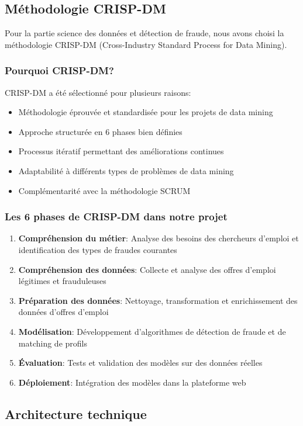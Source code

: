 \documentclass[10pt,a4paper,twocolumn]{article}
\begin{document}
\subsection{Méthodologie CRISP-DM}
Pour la partie science des données et détection de fraude, nous avons choisi la méthodologie CRISP-DM (Cross-Industry Standard Process for Data Mining).

\subsubsection{Pourquoi CRISP-DM?}
CRISP-DM a été sélectionné pour plusieurs raisons:
\begin{itemize}
    \item Méthodologie éprouvée et standardisée pour les projets de data mining
    \item Approche structurée en 6 phases bien définies
    \item Processus itératif permettant des améliorations continues
    \item Adaptabilité à différents types de problèmes de data mining
    \item Complémentarité avec la méthodologie SCRUM
\end{itemize}

\subsubsection{Les 6 phases de CRISP-DM dans notre projet}
\begin{enumerate}
    \item \textbf{Compréhension du métier}: Analyse des besoins des chercheurs d'emploi et identification des types de fraudes courantes
    \item \textbf{Compréhension des données}: Collecte et analyse des offres d'emploi légitimes et frauduleuses
    \item \textbf{Préparation des données}: Nettoyage, transformation et enrichissement des données d'offres d'emploi
    \item \textbf{Modélisation}: Développement d'algorithmes de détection de fraude et de matching de profils
    \item \textbf{Évaluation}: Tests et validation des modèles sur des données réelles
    \item \textbf{Déploiement}: Intégration des modèles dans la plateforme web
\end{enumerate}

\subsection{Architecture technique}
\end{document}
